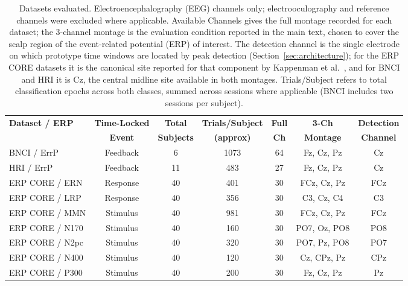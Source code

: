 \begin{table}
\caption{Datasets evaluated. Electroencephalography (EEG) channels only; electrooculography and reference channels were excluded where applicable. Available Channels gives the full montage recorded for each dataset; the 3-channel montage is the evaluation condition reported in the main text, chosen to cover the scalp region of the event-related potential (ERP) of interest. The detection channel is the single electrode on which prototype time windows are located by peak detection (Section~\ref{sec:architecture}); for the ERP CORE datasets it is the canonical site reported for that component by Kappenman et al.~\cite{kappenman2021}, and for BNCI and HRI it is Cz, the central midline site available in both montages. Trials/Subject refers to total classification epochs across both classes, summed across sessions where applicable (BNCI includes two sessions per subject).}
\label{tab:datasets}
\centering
\begin{tabular}{lcccccc}
\hline
\textbf{Dataset / ERP} & \textbf{Time-Locked} & \textbf{Total} & \textbf{Trials/Subject} & \textbf{Full} & \textbf{3-Ch} & \textbf{Detection} \\
 & \textbf{Event} & \textbf{Subjects} & \textbf{(approx)} & \textbf{Ch} & \textbf{Montage} & \textbf{Channel} \\
\hline
BNCI / ErrP & Feedback & 6 & 1073 & 64 & Fz, Cz, Pz & Cz \\
HRI / ErrP & Feedback & 11 & 483 & 27 & Fz, Cz, Pz & Cz \\
ERP CORE / ERN & Response & 40 & 401 & 30 & FCz, Cz, Pz & FCz \\
ERP CORE / LRP & Response & 40 & 356 & 30 & C3, Cz, C4 & C3 \\
ERP CORE / MMN & Stimulus & 40 & 981 & 30 & FCz, Cz, Pz & FCz \\
ERP CORE / N170 & Stimulus & 40 & 160 & 30 & PO7, Oz, PO8 & PO8 \\
ERP CORE / N2pc & Stimulus & 40 & 320 & 30 & PO7, Pz, PO8 & PO7 \\
ERP CORE / N400 & Stimulus & 40 & 120 & 30 & Cz, CPz, Pz & CPz \\
ERP CORE / P300 & Stimulus & 40 & 200 & 30 & Fz, Cz, Pz & Pz \\
\hline
\end{tabular}
\end{table}
